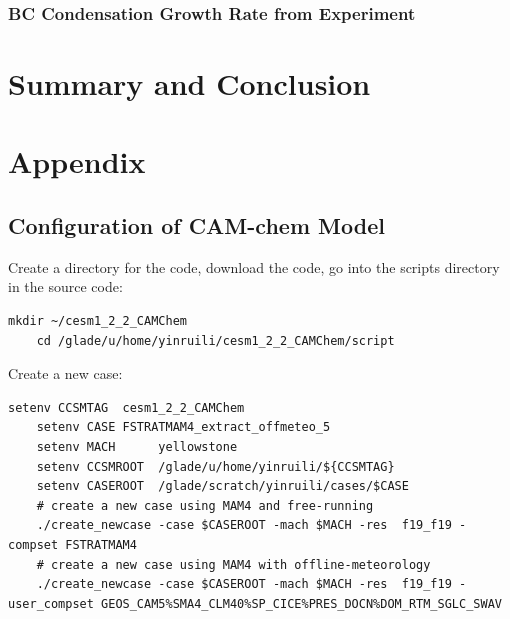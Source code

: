 \documentclass[12pt]{article}
\begin{document}
	\subsubsection{BC Condensation Growth Rate from Experiment}
	
	
	
	


	\section{Summary and Conclusion}
	
	\section{Appendix}
	
	\subsection{Configuration of CAM-chem Model}
	Create a directory for the code, download the code, go into the scripts directory in the source code:
	\begin{lstlisting}[xleftmargin=0.01\textwidth, xrightmargin=0.01\textwidth]
	mkdir ~/cesm1_2_2_CAMChem
	cd /glade/u/home/yinruili/cesm1_2_2_CAMChem/script
	\end{lstlisting}
	
	Create a new case:
	\begin{lstlisting}[xleftmargin=0.01\textwidth, xrightmargin=0.01\textwidth]
	setenv CCSMTAG	cesm1_2_2_CAMChem
	setenv CASE	FSTRATMAM4_extract_offmeteo_5
	setenv MACH      yellowstone
	setenv CCSMROOT  /glade/u/home/yinruili/${CCSMTAG}
	setenv CASEROOT  /glade/scratch/yinruili/cases/$CASE
	# create a new case using MAM4 and free-running
	./create_newcase -case $CASEROOT -mach $MACH -res  f19_f19 -compset FSTRATMAM4
	# create a new case using MAM4 with offline-meteorology
	./create_newcase -case $CASEROOT -mach $MACH -res  f19_f19 -user_compset GEOS_CAM5%SMA4_CLM40%SP_CICE%PRES_DOCN%DOM_RTM_SGLC_SWAV 
	\end{lstlisting}
	
\end{document}
